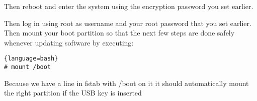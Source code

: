 Then reboot and enter the system using the encryption password you set earlier.

Then log in using root as username and your root password that you set earlier.
Then mount your boot partition so that the next few steps are done safely whenever updating software by executing:
\begin{lstlisting}{language=bash}
# mount /boot
\end{lstlisting}
Because we have a line in fstab with /boot on it it should automatically mount the right partition if the USB key is inserted
